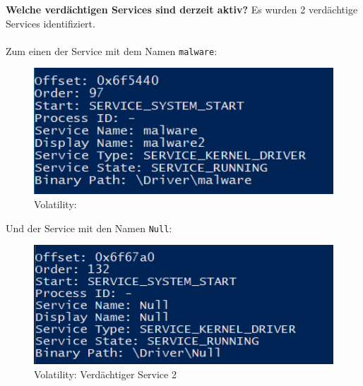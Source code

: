 \documentclass[
    a4paper,
    pagesize,
	pdftex,
    12pt,
]{scrartcl}
\begin{document}
\textbf{Welche verdächtigen Services sind derzeit aktiv?}
Es wurden 2 verdächtige Services identifiziert.
\\ \\
Zum einen der Service mit dem Namen \lstinline[breaklines]|malware|:
\begin{figure}[H]
	\centering
	\includegraphics[width=13cm]{vol-sus-service1.png}
	\caption{Volatility: }
	\label{fig:vol-sus-service1}
\end{figure} 
Und der Service mit den Namen \lstinline[breaklines]|Null|:
\begin{figure}[H]
	\centering
	\includegraphics[width=13cm]{vol-sus-service2.png}
	\caption{Volatility: Verdächtiger Service 2}
	\label{fig:vol-sus-service2.png}
\end{figure} 
\end{document}
